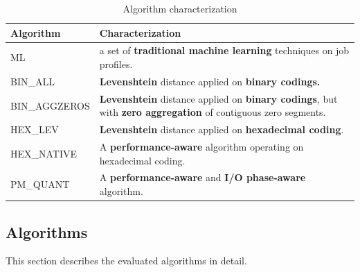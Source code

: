 \documentclass{jhps}
\begin{document}
\begin{table}[ht]
  \begin{tabularx}{\textwidth}{lX}
    Algorithm & Characterization \\
    \midrule
    ML            & a set of \textbf{traditional machine learning} techniques on job profiles.                                                        \\
    BIN\_ALL      & \textbf{Levenshtein} distance applied on \textbf{binary codings.}                                                                 \\
    BIN\_AGGZEROS & \textbf{Levenshtein} distance applied on \textbf{binary codings}, but with \textbf{zero aggregation} of contiguous zero segments. \\
    HEX\_LEV      & \textbf{Levenshtein} distance applied on \textbf{hexadecimal coding}.                                                             \\
    HEX\_NATIVE   & A \textbf{performance-aware} algorithm operating on hexadecimal coding.                                                                                           \\
    PM\_QUANT     & A \textbf{performance-aware} and \textbf{I/O phase-aware} algorithm.                                                              \\
  \end{tabularx}
  \caption{Algorithm characterization}
  \label{tab:alg_character}
\end{table}



\subsection{Algorithms}
This section describes the evaluated algorithms in detail.
\end{document}
